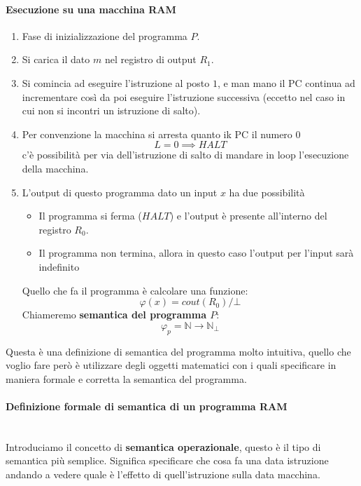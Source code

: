 \documentclass{article}
\begin{document}
\paragraph{Esecuzione su una macchina RAM}
\begin{enumerate}
    \item Fase di inizializzazione del programma $P$.
    \item Si carica il dato $m$ nel registro di output $R_1$.
    \item Si comincia ad eseguire l'istruzione al posto $1$, e man mano
          il PC continua ad incrementare così da poi eseguire l'istruzione successiva
          (eccetto nel caso in cui non si incontri un istruzione di salto).
    \item Per convenzione la macchina si arresta quanto ik PC il numero $0$
          $$L=0\implies HALT$$
          c'è possibilità per via dell'istruzione di salto di mandare in loop
          l'esecuzione della macchina.
    \item L'output di questo programma dato un input $x$ ha due possibilità
          \begin{itemize}
              \item Il programma si ferma ($HALT$) e l'output è presente all'interno del registro $R_0$.
              \item Il programma non termina, allora in questo caso l'output
                    per l'input sarà indefinito
          \end{itemize}
          Quello che fa il programma è calcolare una funzione:
          $$\varphi(x)=cout(R_0)/\bot$$
          Chiameremo \textbf{semantica del programma $P$}:
          $$\varphi_p = \mathbb{N}\rightarrow\mathbb{N}_\bot$$
\end{enumerate}
Questa è una definizione di semantica del programma molto intuitiva, quello che voglio
fare però è utilizzare degli oggetti matematici con i quali specificare
in maniera formale e corretta la semantica del programma.

\paragraph{Definizione formale di semantica di un programma RAM}\mbox{}\\
Introduciamo il concetto di \textbf{semantica operazionale}, questo è il tipo di semantica
più semplice. Significa specificare che cosa fa una data istruzione andando a vedere quale
è l'effetto di quell'istruzione sulla data macchina.
\end{document}
